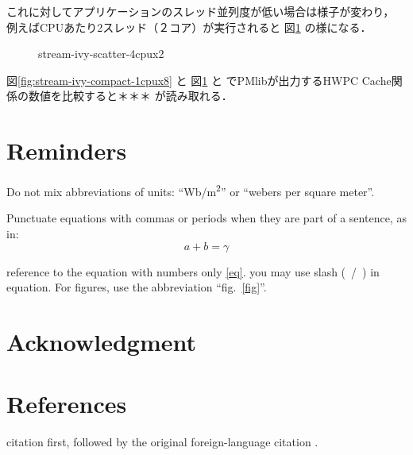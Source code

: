 \documentclass[conference]{IEEEtran}
\begin{document}
これに対してアプリケーションのスレッド並列度が低い場合は様子が変わり，
例えばCPUあたり2スレッド（２コア）が実行されると
図\ref{fig:stream-ivy-scatter-4cpux2} の様になる．\\

\begin{figure}[bt]
\centering
\caption{stream-ivy-scatter-4cpux2}
\label{fig:stream-ivy-scatter-4cpux2}
\end{figure}

図\ref{fig:stream-ivy-compact-1cpux8} と
図\ref{fig:stream-ivy-scatter-4cpux2} と
でPMlibが出力するHWPC Cache関係の数値を比較すると＊＊＊
が読み取れる．



\section{Reminders}
Do not mix abbreviations of units: ``Wb/m\textsuperscript{2}'' or ``webers per square meter''.


Punctuate equations with commas or periods when they are part of a sentence, as in:
\begin{equation}
a+b=\gamma\label{eq}
\end{equation}

reference to the equation with numbers only \eqref{eq}.
you may use slash (~/~) in equation.
For figures, use the abbreviation ``fig.~\ref{fig}''.


\section*{Acknowledgment}

\section*{References}

citation first, followed by the original foreign-language citation \cite{b6}.



\end{document}
